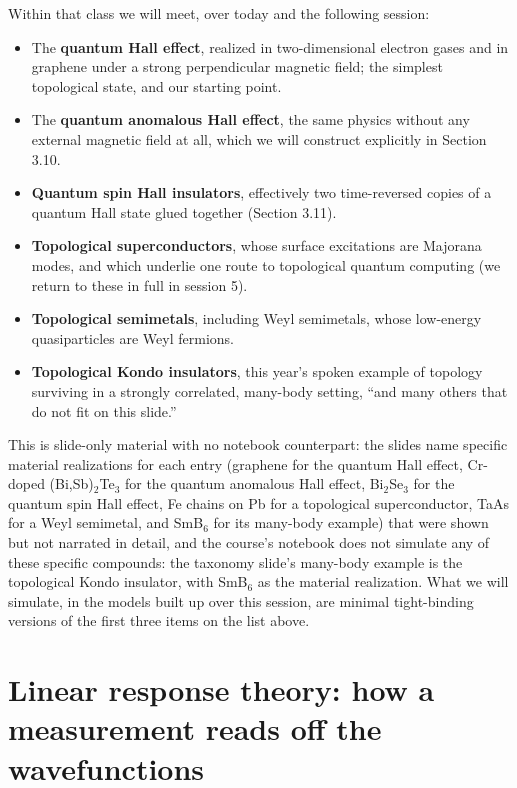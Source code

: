 Within that class we will meet, over today and the following session:

\begin{itemize}
\item The \textbf{quantum Hall effect}, realized in two-dimensional electron gases and in graphene under a
  strong perpendicular magnetic field; the simplest topological state, and our starting point.
\item The \textbf{quantum anomalous Hall effect}, the same physics without any external magnetic field at
  all, which we will construct explicitly in Section 3.10.
\item \textbf{Quantum spin Hall insulators}, effectively two time-reversed copies of a quantum Hall state
  glued together (Section 3.11).
\item \textbf{Topological superconductors}, whose surface excitations are Majorana modes, and which underlie
  one route to topological quantum computing (we return to these in full in session 5).
\item \textbf{Topological semimetals}, including Weyl semimetals, whose low-energy quasiparticles are Weyl
  fermions.
\item \textbf{Topological Kondo insulators}, this year's spoken example of topology surviving in a strongly
  correlated, many-body setting, ``and many others that do not fit on this slide.''
\end{itemize}

This is slide-only material with no notebook counterpart: the slides name specific material
realizations for each entry (graphene for the quantum Hall effect, Cr-doped (Bi,Sb)$_2$Te$_3$ for
the quantum anomalous Hall effect, Bi$_2$Se$_3$ for the quantum spin Hall effect, Fe chains on Pb for
a topological superconductor, TaAs for a Weyl semimetal, and SmB$_6$ for its many-body example) that
were shown but not narrated in detail, and the course's notebook does not simulate any of these
specific compounds: the taxonomy slide's many-body example is the topological Kondo insulator,
with SmB$_6$ as the material realization. What we will simulate, in the models
built up over this session, are minimal tight-binding versions of the first three items on the list
above.

\section{Linear response theory: how a measurement reads off the wavefunctions}

